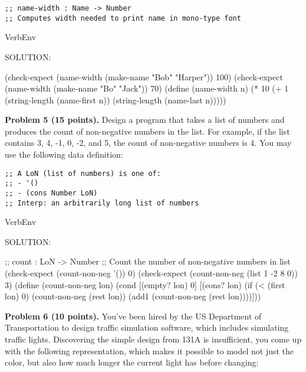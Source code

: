 \documentclass[12pt]{article}
\begin{document}
\begin{verbatim}
;; name-width : Name -> Number
;; Computes width needed to print name in mono-type font
\end{verbatim}

\begin{SaveVerbatim}{VerbEnv}

SOLUTION:
  
(check-expect (name-width (make-name "Bob" "Harper")) 100)
(check-expect (name-width (make-name "Bo" "Jack")) 70)
(define (name-width n)
  (* 10 (+ 1 (string-length (name-first n))
             (string-length (name-last n)))))
\end{SaveVerbatim}



\newpage
\noindent
{\bf Problem 5 (15 points).}  
%
Design a program that takes a list of numbers and produces the count
of non-negative numbers in the list.  For example, if the list
contains 3, 4, -1, 0, -2, and 5, the count of non-negative numbers is
4.  You may use the following data definition:

\begin{verbatim}
;; A LoN (list of numbers) is one of:
;; - '()
;; - (cons Number LoN)
;; Interp: an arbitrarily long list of numbers
\end{verbatim}


\begin{SaveVerbatim}{VerbEnv}

SOLUTION:

;; count : LoN -> Number
;; Count the number of non-negative numbers in list
(check-expect (count-non-neg '()) 0)
(check-expect (count-non-neg (list 1 -2 8 0)) 3)
(define (count-non-neg lon)
  (cond [(empty? lon) 0]
        [(cons? lon)
         (if (< (first lon) 0)
             (count-non-neg (rest lon))
             (add1 (count-non-neg (rest lon))))]))
\end{SaveVerbatim}




\newpage

\noindent
{\bf Problem 6 (10 points).} You've been hired by the US Department of
Transportation to design traffic simulation software, which includes
simulating traffic lights.  Discovering the simple design from 131A is
insufficient, you come up with the following representation, which
makes it possible to model not just the color, but also how much
longer the current light has before changing: 
\end{document}
